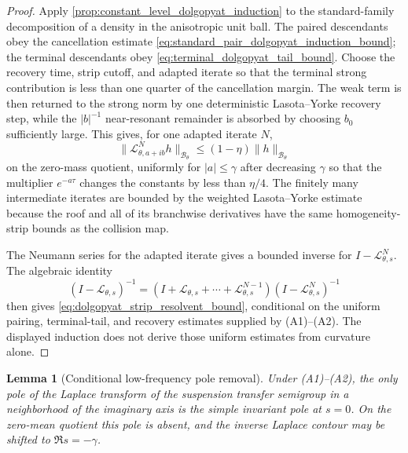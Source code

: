 \documentclass[12pt, letterpaper]{amsart}
\newcommand{\Bcal}{\mathcal{B}}
\providecommand{\Ltransfer}{\mathscr{L}}
\theoremstyle{plain}
\newtheorem{lemma}[theorem]{Lemma}
\theoremstyle{definition}
\theoremstyle{remark}
\begin{document}
\begin{proof}
Apply \cref{prop:constant_level_dolgopyat_induction} to the standard-family
decomposition of a density in the anisotropic unit ball.  The paired descendants
obey the cancellation estimate \eqref{eq:standard_pair_dolgopyat_induction_bound};
the terminal descendants obey \eqref{eq:terminal_dolgopyat_tail_bound}.  Choose
the recovery time, strip cutoff, and adapted iterate so that the terminal strong
contribution is less than one quarter of the cancellation margin.  The weak
term is then returned to the strong norm by one deterministic Lasota--Yorke
recovery step, while the \(|b|^{-1}\) near-resonant remainder is absorbed by
choosing \(b_0\) sufficiently large.  This gives, for one adapted iterate \(N\),
\begin{equation}
\label{eq:weighted_adapted_iterate_contraction}
    \|\Ltransfer_{\theta,a+ib}^{N}h\|_{\Bcal_\theta}
    \le (1-\eta)\|h\|_{\Bcal_\theta}
\end{equation}
on the zero-mass quotient, uniformly for \(|a|\le\gamma\) after decreasing
\(\gamma\) so that the multiplier \(e^{-a\tau}\) changes the constants by less
than \(\eta/4\).  The finitely many intermediate iterates are bounded by the
weighted Lasota--Yorke estimate because the roof and all of its branchwise
derivatives have the same homogeneity-strip bounds as the collision map.

The Neumann series for the adapted iterate gives a bounded inverse for
\(I-\Ltransfer_{\theta,s}^{N}\).  The algebraic identity
\begin{equation}
    (I-\Ltransfer_{\theta,s})^{-1}
    =(I+\Ltransfer_{\theta,s}+\cdots+\Ltransfer_{\theta,s}^{N-1})
      (I-\Ltransfer_{\theta,s}^{N})^{-1}
    \end{equation}
then gives \eqref{eq:dolgopyat_strip_resolvent_bound}, conditional on the
uniform pairing, terminal-tail, and recovery estimates supplied by
\textup{(A1)--(A2)}.  The displayed induction does not derive those uniform
estimates from curvature alone.
\end{proof}

\begin{lemma}[Conditional low-frequency pole removal]
\label{lem:low_frequency_suspension_pole_removal}
Under \textup{(A1)--(A2)}, the only pole of the Laplace transform of the suspension transfer semigroup in
a neighborhood of the imaginary axis is the simple invariant pole at \(s=0\).
On the zero-mean quotient this pole is absent, and the inverse Laplace contour
may be shifted to \(\Re s=-\gamma\).
\end{lemma}
\end{document}
